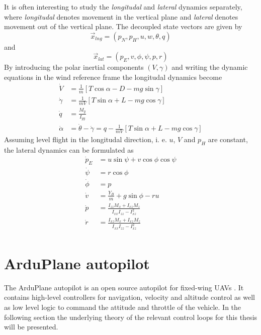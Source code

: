It is often interesting to study the \textit{longitudal} and \textit{lateral} dynamics
separately, where \textit{longitudal} denotes movement in the vertical plane and
\textit{lateral} denotes movement out of the vertical plane. The decoupled state
vectors are given by
\begin{equation}
    \vec{x}_{lng}=(p_N, p_H, u, w, \theta, q)
\end{equation}
and
\begin{equation}
    \vec{x}_{lat}=(p_E, v, \phi, \psi, p, r)
\end{equation}
By introducing the polar inertial components $(V, \gamma)$ and writing the dynamic equations
in the wind reference frame the longitudal dynamics become
\begin{align}
    \dot{V}&=\frac{1}{m}[T\cos\alpha-D-mg\sin\gamma] \\
    \dot{\gamma}&=\frac{1}{mV}[T\sin\alpha + L - mg\cos\gamma] \\
    \dot{q}&=\frac{M_y}{I_{yy}} \\
    \dot{\alpha}&=\dot{\theta}-\dot{\gamma}=q-\frac{1}{mV}[T\sin\alpha + L - mg\cos\gamma]
\end{align}
Assuming level flight in the longitudal direction, i. e. $u$, $V$ and $p_H$ are constant, the lateral dynamics can be formulated as
\begin{align}
    \dot{p}_E &= u\sin\psi + v\cos\phi\cos\psi \\
    \dot{\psi} &= r\cos\phi \\
    \dot{\phi} &= p \\
    \dot{v} &= \frac{Y_B}{m} + g\sin\phi - ru \\
    \dot{p} &= \frac{I_{zz}M_x + I_{xz}M_z}{I_{xx}I_{zz} - I^2_{xz}} \\
    \dot{r} &= \frac{I_{xz}M_x + I_{xz}M_z}{I_{xx}I_{zz} - I^2_{xz}} \\
\end{align}
\section{ArduPlane autopilot}
The ArduPlane autopilot is an open source autopilot for fixed-wing UAVs \cite{arduplane}. 
It contains high-level controllers for navigation, velocity and altitude control as well as 
low level logic to command the attitude and throttle of the vehicle. In the following section
the underlying theory of the relevant control loops for this thesis will be presented.

